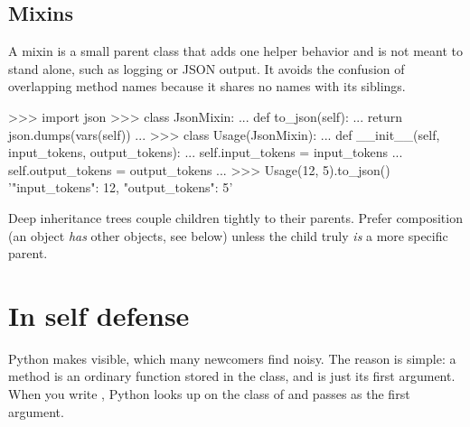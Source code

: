 \subsection{Mixins}

A mixin is a small parent class that adds one helper behavior and is not meant to stand alone,
such as logging or JSON output. It avoids the confusion of overlapping method names because it
shares no names with its siblings.

\begin{pycode}
>>> import json
>>> class JsonMixin:
...     def to_json(self):
...         return json.dumps(vars(self))
...
>>> class Usage(JsonMixin):
...     def __init__(self, input_tokens, output_tokens):
...         self.input_tokens = input_tokens
...         self.output_tokens = output_tokens
...
>>> Usage(12, 5).to_json()
'{"input_tokens": 12, "output_tokens": 5}'
\end{pycode}

\begin{keyidea}
Deep inheritance trees couple children tightly to their parents. Prefer composition (an object
\emph{has} other objects, see below) unless the child truly \emph{is} a more specific parent.
\end{keyidea}

\section{In self defense}

Python makes  visible, which many newcomers find noisy. The reason is simple: a method is an
ordinary function stored in the class, and  is just its first argument. When you write
, Python looks up  on the class of  and passes
 as the first argument.

\begin{center}
\end{center}


